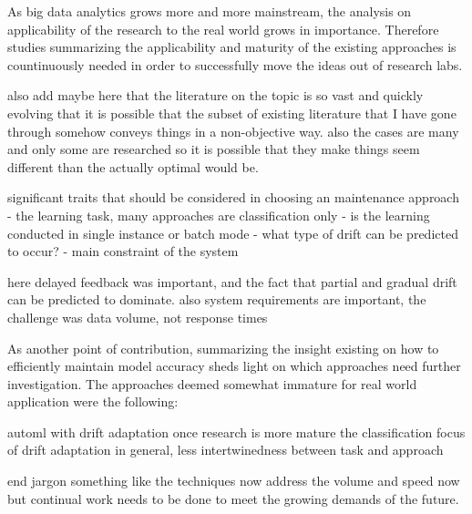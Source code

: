 As big data analytics grows more and more mainstream, the analysis on applicability of the research to the real world grows in importance. Therefore studies summarizing the applicability and maturity of the existing approaches is countinuously needed in order to successfully move the ideas out of research labs.


also add maybe here that the literature on the topic is so vast and quickly evolving that it is possible that the subset of existing literature that I have gone through somehow conveys things in a non-objective way. also the cases are many and only some are researched so it is possible that they make things seem different than the actually optimal would be.

significant traits that should be considered in choosing an maintenance approach
 - the learning task, many approaches are classification only
 - is the learning conducted in single instance or batch mode
 - what type of drift can be predicted to occur?
 - main constraint of the system
 
 here delayed feedback was important, and the fact that partial and gradual drift can be predicted to dominate. also system requirements are important, the challenge was data volume, not response times
 
 As another point of contribution, summarizing the insight existing on how to efficiently maintain model accuracy sheds light on which approaches need further investigation. The approaches deemed somewhat immature for real world application were the following:
 
 automl with drift adaptation once research is more mature
 the classification focus of drift adaptation in general, less intertwinedness between task and approach
 
 end jargon something like the techniques now address the volume and speed now but continual work needs to be done to meet the growing demands of the future.
